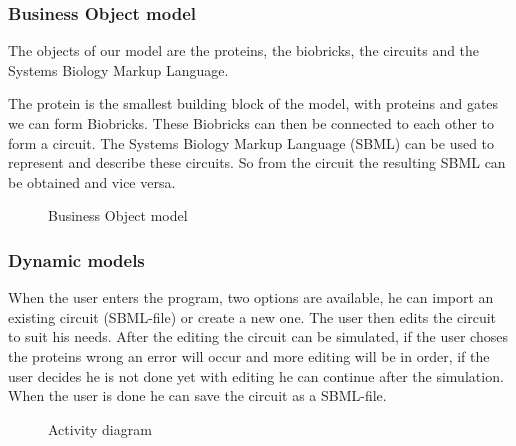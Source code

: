 \documentclass[a4paper]{article}
\begin{document}
\pagebreak
\subsubsection{Business Object model} %
The objects of our model are the proteins, the biobricks, the circuits and the Systems Biology Markup Language.

The protein is the smallest building block of the model, with proteins and gates we can form Biobricks. These Biobricks can then be connected to each other to form a circuit. The Systems Biology Markup Language (SBML) can be used to represent and describe these circuits. So from the circuit the resulting SBML can be obtained and vice versa.
\begin{figure}[h!]
	\caption{Business Object model}
	\centering
\end{figure}

\subsubsection{Dynamic models}
When the user enters the program, two options are available, he can import an existing circuit (SBML-file) or create a new one. The user then edits the circuit to suit his needs. After the editing the circuit can be simulated, if the user choses the proteins wrong an error will occur and more editing will be in order, if the user decides he is not done yet with editing he can continue after the simulation. When the user is done he can save the circuit as a SBML-file.
\begin{figure}[h!]
	\caption{Activity diagram}
	\centering
\end{figure}
\pagebreak
\pagebreak



\pagebreak
\end{document}
